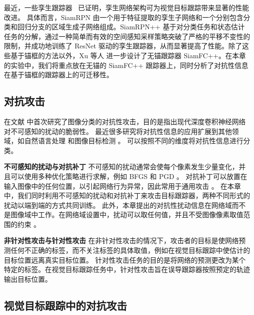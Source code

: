 最近，一些孪生跟踪器~\cite{SiamRPN,SiamRPN++,SiamFC++} 已证明，孪生网络架构可为视觉目标跟踪带来显著的性能改进。
具体而言，SiamRPN \cite{SiamRPN} 由一个用于特征提取的孪生子网络和一个分别包含分类和回归分支的区域生成子网络组成。SiamRPN++ \cite{SiamRPN++} 基于对分类任务和状态估计任务的分解，通过一种简单而有效的空间感知采样策略突破了严格的平移不变性的限制，并成功地训练了 ResNet 驱动的孪生跟踪器，从而显著提高了性能。除了这些基于锚框的方法以外，Xu 等人 \cite{SiamFC++} 进一步设计了无锚跟踪器 SiamFC++。在本章的实验中，我们将重点放在无锚的 SiamFC++ 跟踪器上，同时分析了对抗性信息在基于锚框的跟踪器上的可迁移性。

\subsection{对抗攻击}

在文献 \cite{intriguing} 中首次研究了图像分类的对抗性攻击，目的是指出现代深度卷积神经网络对不可感知的扰动的脆弱性。
最近很多研究将对抗性信息的应用扩展到其他领域，如自然语言处理 \cite{generating} 和图像目标检测 \cite{wei2019transferable}。
可以按照不同的维度将对抗性信息进行分类。

\textbf{不可感知的扰动与对抗补丁} 不可感知的扰动通常会使每个像素发生少量变化，并且可以使用多种优化策略进行求解，例如 BFGS \cite{intriguing} 和 PGD \cite{PGD}。
对抗补丁可以放置在输入图像中的任何位置，以引起网络行为异常，因此常用于通用攻击 \cite{patch}。
在本章中，我们同时利用不可感知的扰动和对抗补丁来攻击目标跟踪器，两种不同形式的扰动以端到端的方式共同训练。
此外，本章提出的对抗性扰动信息在网络域而不是图像域中工作。在网络域设置中，扰动可以取任何值，并且不受图像像素取值范围的约束 \cite{karmon2018lavan}。

\textbf{非针对性攻击与针对性攻击} 在非针对性攻击的情况下，攻击者的目标是使网络预测任何不正确的标签，而不关注标签的具体取值，例如在视觉目标跟踪中使估计的目标位置远离真实目标位置。
针对性攻击任务的目的是将网络的预测更改为某个特定的标签。在视觉目标跟踪任务中，针对性攻击旨在误导跟踪器按照预定的轨迹输出目标位置。

\subsection{视觉目标跟踪中的对抗攻击}

